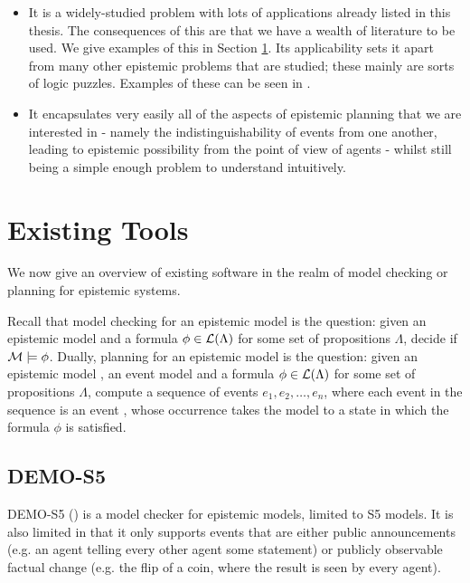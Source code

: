 \documentclass[ %
                    author={Leo Poulson},
                supervisor={Dr. Steven Ramsay},
                    degree={BSc},
                     title={Epistemic Planning for the Dynamic Gossip problem},
                  subtitle={},
                      year={2019} ]{dissertation}
\begin{document}
\begin{itemize}
\item It is a widely-studied problem with lots of applications already listed in
  this thesis. The consequences of this are that we have a wealth of literature
  to be used. We give examples of this in Section \ref{sec:ExistingTools}. Its
  applicability sets it apart from many other epistemic problems that are
  studied; these mainly are sorts of logic puzzles. Examples of these can be
  seen in \cite{DEMO-S5}.
\item It encapsulates very easily all of the aspects of epistemic planning that
  we are interested in - namely the indistinguishability of events from one
  another, leading to epistemic possibility from the point of view of agents -
  whilst still being a simple enough problem to understand intuitively.  
\end{itemize}

\section{Existing Tools}
\label{sec:ExistingTools}

We now give an overview of existing software in the realm of model checking or
planning for epistemic systems.

Recall that model checking for an epistemic model is the question: given an
epistemic model  and a formula $\phi \in \mathcal{L}(\Lambda)$ for some set of
propositions $\Lambda$, decide if $\mathcal{M} \models \phi$. Dually, planning for an
epistemic model is the question: given an epistemic model , an event
model  and a formula $\phi \in \mathcal{L}(\Lambda)$ for some set of
propositions $\Lambda$, compute a sequence of events $e_1, e_2, \ldots, e_n$,
where each event in the sequence is an event , whose occurrence takes the
model  to a state in which the formula $\phi$ is satisfied. 

\subsection{DEMO-S5}

DEMO-S5 (\cite{DEMO-S5}) is a model checker for epistemic models, limited to
\textsf{S5} models. It is also limited in that it only supports events that are either
public announcements (e.g. an agent telling every other agent some statement) or
publicly observable factual change (e.g. the flip of a coin, where the result is
seen by every agent).
\end{document}
